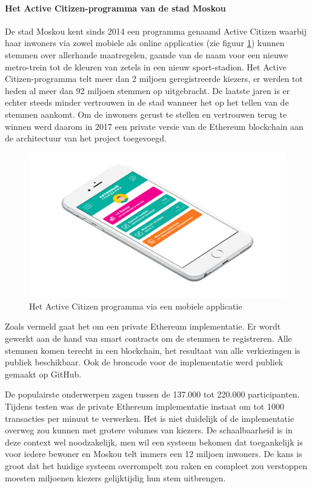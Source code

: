 				\paragraph{Het Active Citizen-programma van de stad Moskou}
				De stad Moskou kent sinds 2014 een programma genaamd Active Citizen waarbij haar inwoners via zowel mobiele als online applicaties (zie figuur \ref{fig:active_citizen}) kunnen stemmen over allerhande maatregelen, gaande van de naam voor een nieuwe metro-trein tot de kleuren van zetels in een nieuw sport-stadion. Het Active Citizen-programma telt meer dan 2 miljoen geregistreerde kiezers, er werden tot heden al meer dan 92 miljoen stemmen op uitgebracht. De laatste jaren is er echter steeds minder vertrouwen in de stad wanneer het op het tellen van de stemmen aankomt. Om de inwoners gerust te stellen en vertrouwen terug te winnen werd  daarom in 2017 een private versie van de Ethereum blockchain aan de architectuur van het project toegevoegd. ~\autocite{Kshetri2018}
				
				\begin{figure}
					\includegraphics[width=\linewidth]{img/active_citizen.png}
					\caption{Het Active Citizen programma via een mobiele applicatie}
					\label{fig:active_citizen}
				\end{figure}
				
				Zoals vermeld gaat het om een private Ethereum implementatie. Er wordt gewerkt aan de hand van smart contracts om de stemmen te registreren. Alle stemmen komen terecht in een  blockchain, het resultaat van alle verkiezingen is publiek beschikbaar. Ook de broncode voor de implementatie werd publiek gemaakt op GitHub.
				
				De populairste onderwerpen zagen tussen de 137.000 tot 220.000 participanten. Tijdens testen was de private Ethereum implementatie  instaat om tot 1000 transacties per minuut te verwerken. Het is niet duidelijk of de implementatie overweg zou kunnen met  grotere volumes van kiezers. De schaalbaarheid is in deze context wel noodzakelijk, men wil een systeem bekomen dat toegankelijk is voor iedere bewoner en Moskou telt immers een 12 miljoen inwoners. De kans is groot dat het huidige systeem overrompelt zou raken en compleet zou verstoppen moesten miljoenen kiezers gelijktijdig hun stem uitbrengen.
				
